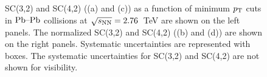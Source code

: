 \begin{figure}
	\begin{center}
        \caption{SC(3,2) and SC(4,2) ((a) and (c)) as a function of minimum $p_{\rm T}$ cuts in $\textnormal{Pb--Pb}$ collisions at $\sqrt{s_{\textnormal{NN}}}=2.76$~TeV are shown on the left panels. The normalized SC(3,2) and SC(4,2) ((b) and (d)) are shown on the right panels. Systematic uncertainties are represented with boxes. The systematic uncertainties for SC(3,2) and SC(4,2) are not shown for visibility.}
        \label{fig:Figure_2}
        \end{center}   
\end{figure}

